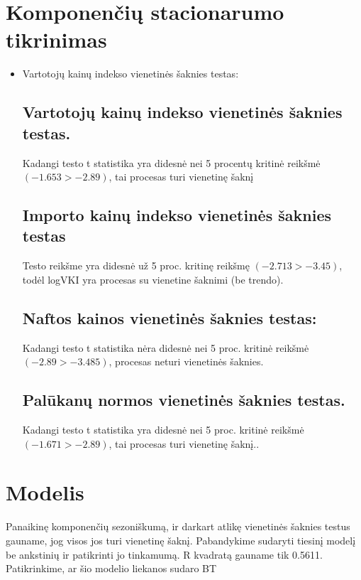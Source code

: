 \documentclass[a4paper]{article}
\begin{document}
\section{Komponenčių stacionarumo tikrinimas}
\begin{itemize}
\item Vartotojų kainų indekso vienetinės šaknies testas:

\subsection{Vartotojų kainų indekso vienetinės šaknies testas.}
\textnormal {Kadangi  testo t statistika yra didesnė nei 5 procentų kritinė reikšmė $(-1.653 > -2.89)$, tai  procesas turi vienetinę šaknį}

\subsection {Importo kainų indekso vienetinės šaknies testas}
\textnormal{ Testo reikšme yra didesnė už 5 proc.  kritinę reikšmę $(-2.713>-3.45)$, todėl logVKI yra procesas su vienetine šaknimi (be trendo).}


\subsection{ Naftos kainos vienetinės šaknies testas:}
\textnormal{Kadangi testo t statistika nėra didesnė nei 5 proc. kritinė reikšmė $(-2.89 > -3.485)$,  procesas neturi vienetinės  šaknies.}


\subsection{Palūkanų normos vienetinės šaknies testas.}
\textnormal{Kadangi  testo t statistika yra didesnė nei 5 proc. kritinė reikšmė $(-1.671 > -2.89)$, tai  procesas turi vienetinę šaknį..}

\end{itemize}


\newpage
\section{Modelis}
\textnormal{Panaikinę komponenčių sezoniškumą, ir darkart atlikę vienetinės šaknies testus gauname, jog visos jos turi vienetinę šaknį. Pabandykime sudaryti tiesinį modelį be ankstinių ir patikrinti jo tinkamumą. R kvadratą gauname tik 0.5611. Patikrinkime, ar šio modelio liekanos sudaro BT}
\end{document}
